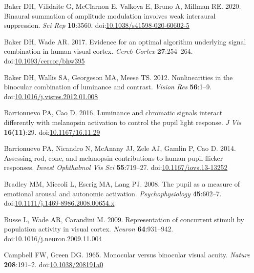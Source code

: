 \documentclass[
]{article}
\newlength{\cslhangindent}
\newlength{\cslentryspacingunit} %
\newenvironment{CSLReferences}[2] %
 {%
  \setlength{\parindent}{0pt}
  \ifodd #1
  \let\oldpar\par
  \def\par{\hangindent=\cslhangindent\oldpar}
  \fi
  \setlength{\parskip}{#2\cslentryspacingunit}
 }%
 {}
\begin{document}
\begin{CSLReferences}{1}{0}
\leavevmode{}%
Baker DH, Vilidaite G, McClarnon E, Valkova E, Bruno A, Millman RE. 2020. Binaural summation of amplitude modulation involves weak interaural suppression. \emph{Sci Rep} \textbf{10}:3560. doi:\href{https://doi.org/10.1038/s41598-020-60602-5}{10.1038/s41598-020-60602-5}

\leavevmode{}%
Baker DH, Wade AR. 2017. Evidence for an optimal algorithm underlying signal combination in human visual cortex. \emph{Cereb Cortex} \textbf{27}:254--264. doi:\href{https://doi.org/10.1093/cercor/bhw395}{10.1093/cercor/bhw395}

\leavevmode{}%
Baker DH, Wallis SA, Georgeson MA, Meese TS. 2012. Nonlinearities in the binocular combination of luminance and contrast. \emph{Vision Res} \textbf{56}:1--9. doi:\href{https://doi.org/10.1016/j.visres.2012.01.008}{10.1016/j.visres.2012.01.008}

\leavevmode{}%
Barrionuevo PA, Cao D. 2016. Luminance and chromatic signals interact differently with melanopsin activation to control the pupil light response. \emph{J Vis} \textbf{16(11)}:29. doi:\href{https://doi.org/10.1167/16.11.29}{10.1167/16.11.29}

\leavevmode{}%
Barrionuevo PA, Nicandro N, McAnany JJ, Zele AJ, Gamlin P, Cao D. 2014. Assessing rod, cone, and melanopsin contributions to human pupil flicker responses. \emph{Invest Ophthalmol Vis Sci} \textbf{55}:719--27. doi:\href{https://doi.org/10.1167/iovs.13-13252}{10.1167/iovs.13-13252}

\leavevmode{}%
Bradley MM, Miccoli L, Escrig MA, Lang PJ. 2008. The pupil as a measure of emotional arousal and autonomic activation. \emph{Psychophysiology} \textbf{45}:602--7. doi:\href{https://doi.org/10.1111/j.1469-8986.2008.00654.x}{10.1111/j.1469-8986.2008.00654.x}

\leavevmode{}%
Busse L, Wade AR, Carandini M. 2009. Representation of concurrent stimuli by population activity in visual cortex. \emph{Neuron} \textbf{64}:931--942. doi:\href{https://doi.org/10.1016/j.neuron.2009.11.004}{10.1016/j.neuron.2009.11.004}

\leavevmode{}%
Campbell FW, Green DG. 1965. Monocular versus binocular visual acuity. \emph{Nature} \textbf{208}:191--2. doi:\href{https://doi.org/10.1038/208191a0}{10.1038/208191a0}


\end{CSLReferences}
\end{document}
